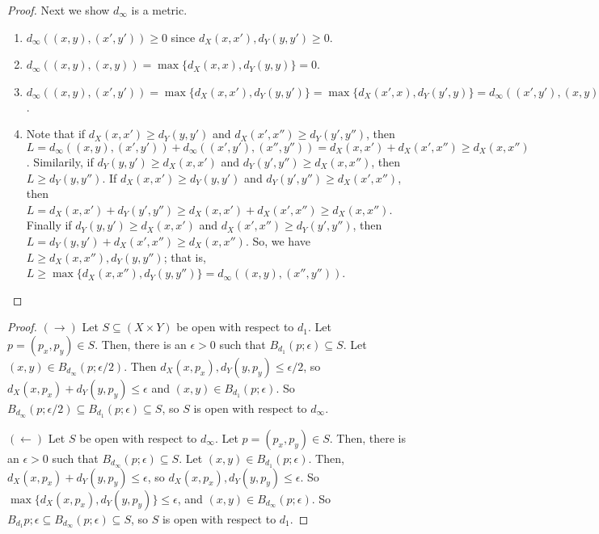 \documentclass[11pt, letterpaper]{article}
\begin{document}
\begin{enumerate}
\begin{proof}
  Next we show $d_\infty$ is a metric.
  \begin{enumerate}
    \item $d_\infty((x, y), (x', y')) \geq 0$ since $d_X(x, x'), d_Y(y, y') \geq 0$.
    \item $d_\infty((x, y), (x, y)) = \max \lbrace d_X(x, x), d_Y(y, y) \rbrace = 0$.
    \item $d_\infty((x, y), (x', y')) = \max \lbrace d_X(x, x'), d_Y(y, y') \rbrace = \max \lbrace d_X(x', x), d_Y(y', y) \rbrace = d_\infty((x', y'), (x, y))$.
    \item Note that if $d_X(x, x') \geq d_Y(y, y')$ and $d_X(x', x'') \geq d_Y(y', y'')$, then $L = d_\infty((x, y), (x', y')) + d_\infty((x', y'), (x'', y'')) = d_X(x, x') + d_X(x', x'') \geq d_X(x, x'')$. Similarily, if $d_Y(y, y') \geq d_X(x, x')$ and $d_Y(y', y'') \geq d_X(x, x'')$, then $L \geq d_Y(y, y'')$. If $d_X(x, x') \geq d_Y(y, y')$ and $d_Y(y', y'') \geq d_X(x', x'')$, then $L = d_X(x, x') + d_Y(y', y'') \geq d_X(x, x') + d_X(x', x'') \geq d_X(x, x'')$. Finally if $d_Y(y, y') \geq d_X(x, x')$ and $d_X(x', x'') \geq d_Y(y', y'')$, then $L = d_Y(y, y') + d_X(x', x'') \geq d_X(x, x'')$. So, we have $L \geq d_X(x, x''), d_Y(y, y'')$; that is, $L \geq \max \lbrace d_X(x, x''), d_Y(y, y'') \rbrace = d_\infty((x, y), (x'', y''))$.
  \end{enumerate}
  \end{proof}

  \begin{proof}
    $(\rightarrow)$ Let $S \subseteq (X \times Y)$ be open with respect to $d_1$. Let $p = (p_x, p_y) \in S$. Then, there is an $\epsilon > 0$ such that $B_{d_1}(p; \epsilon) \subseteq S$. Let $(x, y) \in B_{d_\infty}(p; \epsilon/2)$. Then $d_X(x, p_x), d_Y(y, p_y) \leq \epsilon/2$, so $d_X(x, p_x) + d_Y(y, p_y) \leq \epsilon$ and $(x, y) \in B_{d_1}(p; \epsilon)$. So $B_{d_\infty}(p; \epsilon/2) \subseteq B_{d_1}(p; \epsilon) \subseteq S$, so $S$ is open with respect to $d_\infty$. 

    $(\leftarrow)$ Let $S$ be open with respect to $d_\infty$. Let $p = (p_x, p_y) \in S$. Then, there is an $\epsilon > 0$ such that $B_{d_\infty}(p; \epsilon) \subseteq S$. Let $(x, y) \in B_{d_1}(p; \epsilon)$. Then, $d_X(x, p_x) + d_Y(y, p_y) \leq \epsilon$, so $d_X(x, p_x), d_Y(y, p_y) \leq \epsilon$. So $\max \lbrace d_X(x, p_x), d_Y(y, p_y) \rbrace \leq \epsilon$, and $(x, y) \in B_{d_\infty}(p; \epsilon)$. So $B_{d_1}{p; \epsilon} \subseteq B_{d_\infty}(p; \epsilon) \subseteq S$, so $S$ is open with respect to $d_1$.
  \end{proof}
\end{enumerate}
\end{document}
